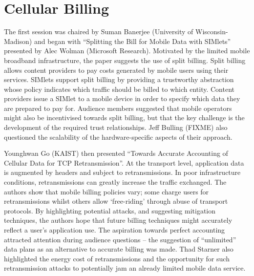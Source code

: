 \section{Cellular Billing}
\label{sec:cellbilling}

The first session was chaired by Suman Banerjee (University of Wisconsin-Madison)
and began with ``Splitting the Bill for Mobile Data with SIMlets'' presented by 
Alec Wolman (Microsoft Research). Motivated by the limited mobile broadband 
infrastructure, the paper suggests the use of split billing. Split billing allows 
content providers to pay costs generated by mobile users using their services.
SIMlets support split billing by providing a trustworthy abstraction whose policy indicates which traffic should be billed to 
which entity. Content providers issue a SIMlet to a mobile device in order to 
specify which data they are prepared to pay for.
Audience members suggested that mobile operators might also be incentivised 
towards split billing, but that the key challenge is the development of the 
required trust relationships. Jeff Bulling (FIXME) also questioned the 
scalability of the hardware-specific aspects of their approach.

Younghwan Go (KAIST) then presented ``Towards Accurate Accounting of Cellular 
Data for TCP Retransmission''. At the transport level, application data
is augmented by headers and subject to retransmissions. In 
poor infrastructure conditions, retransmissions can greatly increase the traffic 
exchanged. The authors show that mobile billing policies vary; some charge users 
for retransmissions whilst others allow `free-riding' through abuse of transport 
protocols. By highlighting potential attacks, and suggesting mitigation 
techniques, the authors hope that future billing techniques might accurately 
reflect a user's application use.
The aspiration towards perfect accounting attracted attention during audience
questions -- the suggestion of ``unlimited'' data plans as an
alternative to accurate billing was made. Thad Starner also highlighted the 
energy cost of retransmissions %
and the opportunity for such retransmission attacks to potentially jam an already 
limited mobile data service.